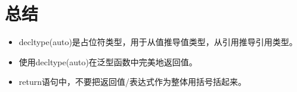 \section{总结}
\begin{itemize}
	\item decltype(auto)是占位符类型，用于从值推导值类型，从引用推导引用类型。
	\item 使用decltype(auto)在泛型函数中完美地返回值。
	\item return语句中，不要把返回值/表达式作为整体用括号括起来。
\end{itemize}


